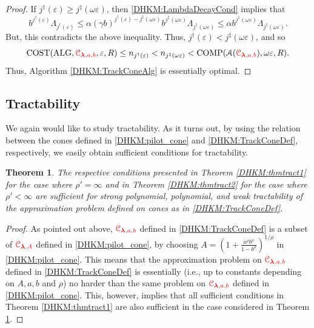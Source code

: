 \documentclass[USenglish]{article}
\theoremstyle{dgthm}
\newtheorem{theorem}{Theorem}
\theoremstyle{dgthm}
\theoremstyle{dgthm}
\theoremstyle{dgthm}
\theoremstyle{dgdef}
\theoremstyle{definition}
\DeclareMathOperator{\ALG}{ALG}
\DeclareMathOperator{\COST}{COST}
\DeclareMathOperator{\COMP}{COMP}
\newcommand{\DHKMchange}[1]{{\color{red}{#1}}}
\begin{document}
\begin{proof}
If $j^{\dagger}(\varepsilon) \ge j^{\ddagger}(\omega \varepsilon)$, then \eqref{DHKM:LambdaDecayCond} implies that 
\[
 b^{j^\dagger(\varepsilon)} \Lambda_{j^\dagger(\varepsilon) } \le \alpha (\gamma b)^{j^{\dagger}(\varepsilon) - j^{\ddagger}(\omega \varepsilon)} b^{j^{\ddagger}(\omega \varepsilon) } \Lambda_{j^\ddagger(\omega \varepsilon) } \le \alpha b^{j^{\ddagger}(\omega \varepsilon) } \Lambda_{j^\ddagger(\omega \varepsilon) }.
\]
But, this contradicts the above inequality.  Thus, $j^\dagger(\varepsilon) < j^\ddagger(\omega \varepsilon)$, and so
\[
\COST(\ALG,\DHKMchange{\calC_{\boldsymbol{\lambda},a,b}},\varepsilon,R) \le n_{j^\dagger(\varepsilon)} < n_{j^\ddagger(\omega \varepsilon)} < \COMP(\calA(\DHKMchange{\calC_{\boldsymbol{\lambda},a,b}}),\omega \varepsilon,R).
\]
Thus,  Algorithm \ref{DHKM:TrackConeAlg} is essentially optimal.
\end{proof}


\subsection{Tractability}\label{DHKM:SecDecayTract}



We again would like to study tractability. As it turns out, by using the relation 
between the cones defined in \eqref{DHKM:pilot_cone} and \eqref{DHKM:TrackConeDef}, respectively, we 
easily obtain sufficient conditions for tractability. 

\begin{theorem} \label{DHKM:thmtract3}
The respective conditions presented in Theorem \ref{DHKM:thmtract1} for the case where $\rho'=\infty$ and 
in Theorem \ref{DHKM:thmtract2} for the case where $\rho'<\infty$ are sufficient for strong polynomial, polynomial, and weak tractability of the approximation problem defined on cones as in \eqref{DHKM:TrackConeDef}.
\end{theorem}
\begin{proof}
As pointed out above, $\DHKMchange{\calC_{\boldsymbol{\lambda},a,b}}$ defined in \eqref{DHKM:TrackConeDef} is a subset of  $\DHKMchange{\calC_{\boldsymbol{\lambda},A}}$ defined in \eqref{DHKM:pilot_cone}, by choosing $A=\left(1 + \frac{a^\rho b^\rho}{1 - b^\rho} \right)^{1/\rho}$ in \eqref{DHKM:pilot_cone}. This means that the approximation problem on  $\DHKMchange{\calC_{\boldsymbol{\lambda},a,b}}$ defined in \eqref{DHKM:TrackConeDef} is essentially (i.e., up to constants depending on $A,a,b$ and $\rho$) no harder than the same problem on $\DHKMchange{\calC_{\boldsymbol{\lambda},a,b}}$ defined in \eqref{DHKM:pilot_cone}. This, however, implies that all sufficient conditions in Theorem \ref{DHKM:thmtract1} are also sufficient in the case considered in Theorem \ref{DHKM:thmtract3}.
\end{proof}
\end{document}
